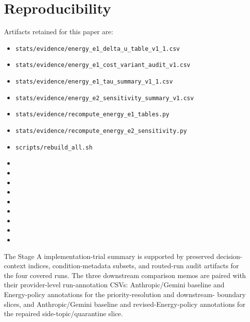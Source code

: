 \documentclass[11pt,a4paper]{article}
\begin{document}
\section{Reproducibility}
\label{sec:repro}

Artifacts retained for this paper are:
\begin{itemize}
  \item \texttt{stats/evidence/energy\_e1\_delta\_u\_table\_v1\_1.csv}
  \item \texttt{stats/evidence/energy\_e1\_cost\_variant\_audit\_v1.csv}
  \item \texttt{stats/evidence/energy\_e1\_tau\_summary\_v1\_1.csv}
  \item \texttt{stats/evidence/energy\_e2\_sensitivity\_summary\_v1.csv}
  \item \texttt{stats/evidence/recompute\_energy\_e1\_tables.py}
  \item \texttt{stats/evidence/recompute\_energy\_e2\_sensitivity.py}
  \item \texttt{scripts/rebuild\_all.sh}
  \item {}
  \item {}
  \item {}
  \item {}
  \item {}
  \item {}
  \item {}
  \item {}
  \item {}
\end{itemize}

The Stage A implementation-trial summary is supported by preserved
decision-context indices, condition-metadata subsets, and routed-run audit
artifacts for the four covered runs. The three downstream comparison memos are
paired with their provider-level run-annotation CSVs: Anthropic/Gemini baseline
and Energy-policy annotations for the priority-resolution and downstream-
boundary slices, and Anthropic/Gemini baseline and revised-Energy-policy
annotations for the repaired side-topic/quarantine slice.
\end{document}
